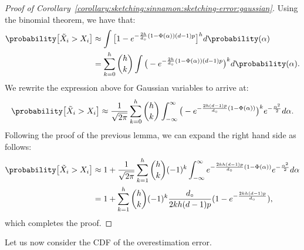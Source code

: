 \begin{proof}[Proof of Corollary~\ref{corollary:sketching:sinnamon:sketching-error:gaussian}]
    Using the binomial theorem, we have that:
    \begin{align*}
        \probability\big[ \tilde{X}_i > X_i \big] &\approx
        \int {\big[ 1 - e^{-\frac{2h}{d_\circ} (1 - \Phi(\alpha)) (d - 1) p } \big]^h d\probability(\alpha)} \\
        &= \sum_{k=0}^{h} { \binom{h}{k} \int \big( -e^{-\frac{2h}{d_\circ} (1 - \Phi(\alpha)) (d - 1) p } \big)^{k} d\probability(\alpha)}.
    \end{align*}
    We rewrite the expression above for Gaussian variables to arrive at:
    \begin{equation*}
        \probability\big[ \tilde{X}_i > X_i \big] \approx \frac{1}{\sqrt{2\pi}} \sum_{k=0}^{h} \binom{h}{k} \int_{-\infty}^{\infty} {\big(- e^{-\frac{2h(d - 1)p}{d_\circ} (1 - \Phi(\alpha))} \big)^{k} e^{-\frac{\alpha^2}{2}} d\alpha}.
    \end{equation*}
    Following the proof of the previous lemma, we can expand the right hand side as follows:
    \begin{align*}
        \probability\big[ \tilde{X}_i > X_i \big] &\approx 
        1 + \frac{1}{\sqrt{2\pi}} \sum_{k=1}^{h} \binom{h}{k} (-1)^k \int_{-\infty}^{\infty} {e^{-\frac{2kh(d - 1)p}{d_\circ} (1 - \Phi(\alpha))} e^{-\frac{\alpha^2}{2}} d\alpha} \\
        &= 1 + \sum_{k=1}^{h} \binom{h}{k} (-1)^k \frac{d_\circ}{2kh(d - 1)p} (1 - e^{-\frac{2kh(d - 1)p}{d_\circ}} ),
    \end{align*}
    which completes the proof.
\end{proof}

Let us now consider the CDF of the overestimation error.

